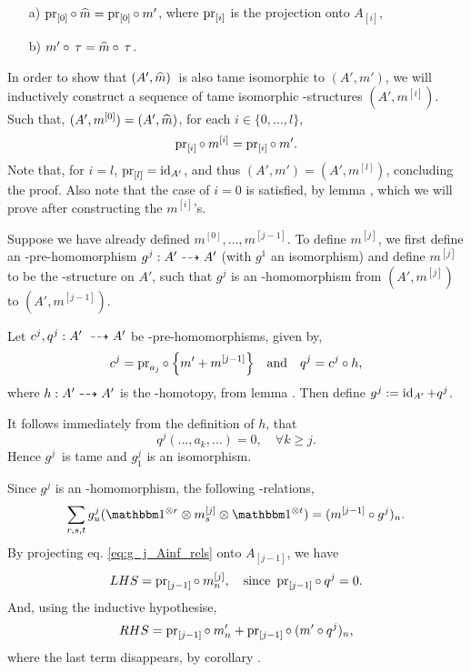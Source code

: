 \begin{lemma}
\label{lemma:move_ii_alpha}
\begin{itemize}
\item[a)] $\operatorname{pr}_{[0]} \circ\: \widehat{m}  = \operatorname{pr}_{[0]} \circ\: m'$, where
$\operatorname{pr}_{[i]}$ is the projection onto $A_{[i]}$,
\item[b)] $m' \circ\:\tau = \widehat{m} \circ\: \tau$.
\end{itemize}
\end{lemma}

In order to show that $(A', \widehat{m})$ is also
tame isomorphic to $(A', m')$, we will inductively construct a sequence of
tame isomorphic \Ainf-structures $(A', m^{[i]})$. Such that, $(A', m^{[0]}) =
(A', \widehat{m})$, for each $i \in \{ 0,...,l \}$,
\[ \operatorname{pr}_{[i]} \circ\: m^{[i]}  = \operatorname{pr}_{[i]} \circ\: m'. \]
Note that, for $i=l$, $\operatorname{pr}_{[l]} = \operatorname{id}_{A'}$, and thus $(A',m') =
(A',m^{[l]})$, concluding the proof. Also note that the case of $i=0$ is satisfied,
by lemma , which we will prove after
constructing the $m^{[i]}$'s. 

Suppose we have already defined $m^{[0]}, ..., m^{[j-1]}$. To define
$m^{[j]}$, we first define an \Ainf-pre-homomorphism $g^j: A' \dashrightarrow A'$ 
(with $g^1$ an isomorphism) and define
$m^{[j]}$ to be the \Ainf-structure on $A'$, such that $g^j$ is an
\Ainf-homomorphism from $(A',m^{[j]})$ to $(A',m^{[j-1]})$.

Let $c^j, q^j : A' \ato A'$ be \Ainf-pre-homomorphisms, given by, 
\begin{equation}
\label{eq:c_q_def}
c^j = \operatorname{pr}_{a_j} \circ\: \qty{ m' + m^{[j-1]} } \quad\text{and}\quad 
q^j = c^j \circ h,
\end{equation}
where $h: A' \dashrightarrow A'$ is the \Ainf-homotopy, from lemma
. Then define $g^j := \operatorname{id}_{A'} + q^j$.

It follows immediately from the definition of $h$, that
\begin{equation}
\label{eq:q_j_simple}
q^j(...,a_k,...) = 0, \quad \forall k \ge j.
\end{equation}
Hence $g^j$ is tame and $g^j_1$ is an isomorphism. 

Since $g^j$ is an \Ainf-homomorphism, the following \Ainf-relations,
\begin{equation}
\label{eq:g_j_Ainf_rels}
\sum_{r,s,t} g^j_u (\I^{\otimes r} \otimes m^{[j]}_s \otimes 
\I^{\otimes t}) = (m^{[j-1]} \circ g^j)_n. 
\end{equation}
%
By projecting eq. \ref{eq:g_j_Ainf_rels} onto $A_{[j-1]}$, we have
\[ LHS = \operatorname{pr}_{[j-1]} \circ\: m^{[j]}_n, \quad \text{since } \operatorname{pr}_{[j-1]}
\circ\: q^j = 0. \]
And, using the inductive hypothesise,
\[ RHS = \operatorname{pr}_{[j-1]} \circ\: m'_n + \operatorname{pr}_{[j-1]} \circ\: ( m' \circ q^j )_n, \]
where the last term disappears, by corollary .

